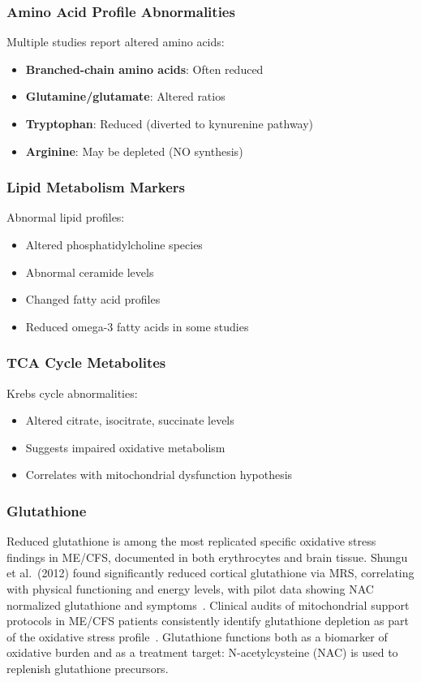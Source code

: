 \subsubsection{Amino Acid Profile Abnormalities}
Multiple studies report altered amino acids:
\begin{itemize}
    \item \textbf{Branched-chain amino acids}: Often reduced
    \item \textbf{Glutamine/glutamate}: Altered ratios
    \item \textbf{Tryptophan}: Reduced (diverted to kynurenine pathway)
    \item \textbf{Arginine}: May be depleted (NO synthesis)
\end{itemize}

\subsubsection{Lipid Metabolism Markers}
Abnormal lipid profiles:
\begin{itemize}
    \item Altered phosphatidylcholine species
    \item Abnormal ceramide levels
    \item Changed fatty acid profiles
    \item Reduced omega-3 fatty acids in some studies
\end{itemize}

\subsubsection{TCA Cycle Metabolites}
Krebs cycle abnormalities:
\begin{itemize}
    \item Altered citrate, isocitrate, succinate levels
    \item Suggests impaired oxidative metabolism
    \item Correlates with mitochondrial dysfunction hypothesis
\end{itemize}

\subsubsection{Glutathione}

Reduced glutathione is among the most replicated specific oxidative stress findings in ME/CFS, documented in both erythrocytes and brain tissue. Shungu et al.\ (2012) found significantly reduced cortical glutathione via MRS, correlating with physical functioning and energy levels, with pilot data showing NAC normalized glutathione and symptoms~\cite{Shungu2012glutathione}. Clinical audits of mitochondrial support protocols in ME/CFS patients consistently identify glutathione depletion as part of the oxidative stress profile~\cite{Myhill2012audit}. Glutathione functions both as a biomarker of oxidative burden and as a treatment target: N-acetylcysteine (NAC) is used to replenish glutathione precursors.

